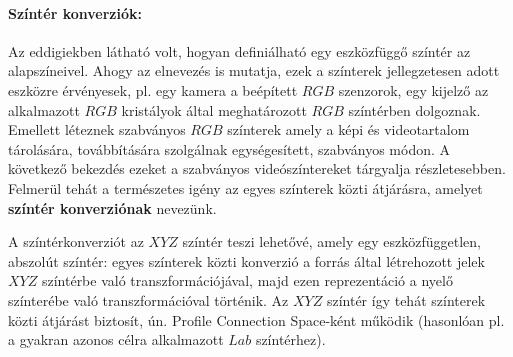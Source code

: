 \paragraph{Színtér konverziók:\\}
Az eddigiekben látható volt, hogyan definiálható egy eszközfüggő színtér az alapszíneivel.
Ahogy az elnevezés is mutatja, ezek a színterek jellegzetesen adott eszközre érvényesek, pl. egy kamera a beépített $RGB$ szenzorok, egy kijelző az alkalmazott $RGB$ kristályok által meghatározott $RGB$ színtérben dolgoznak.
Emellett léteznek szabványos $RGB$ színterek amely a képi és videotartalom tárolására, továbbítására szolgálnak egységesített, szabványos módon.
A következő bekezdés ezeket a szabványos videószíntereket tárgyalja részletesebben.
Felmerül tehát a természetes igény az egyes színterek közti átjárásra, amelyet \textbf{színtér konverziónak} nevezünk.

A színtérkonverziót az $XYZ$ színtér teszi lehetővé, amely egy eszközfüggetlen, abszolút színtér:
egyes színterek közti konverzió a forrás által létrehozott jelek $XYZ$ színtérbe való transzformációjával, majd ezen reprezentáció a nyelő színterébe való transzformációval történik.
Az $XYZ$ színtér így tehát színterek közti átjárást biztosít, ún. Profile Connection Space-ként működik (hasonlóan pl. a gyakran azonos célra alkalmazott $Lab$ színtérhez).

